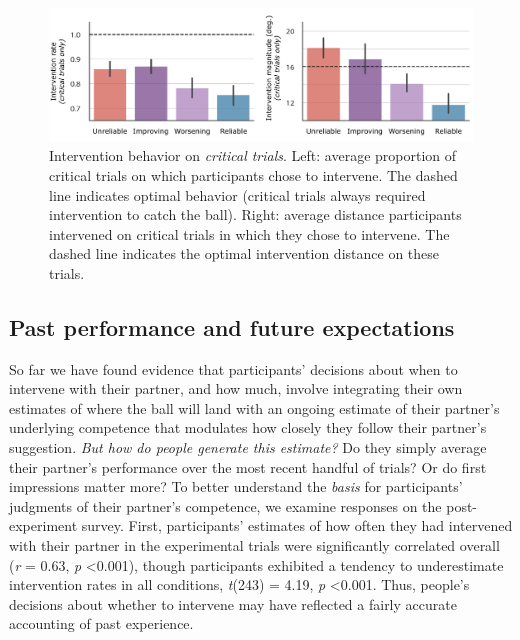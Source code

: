 \documentclass[10pt,letterpaper]{article}
\begin{document}
\begin{figure}[H]
\begin{center}
\includegraphics[width=\linewidth]{img/critical_trial_intervention_summary.pdf}
\end{center}
\caption{Intervention behavior on \textit{critical trials}. Left: average proportion of critical trials on which participants chose to intervene. The dashed line indicates optimal behavior (critical trials always required intervention to catch the ball). Right: average distance participants intervened on critical trials in which they chose to intervene. The dashed line indicates the optimal intervention distance on these trials.} 
\label{fig:critical_trials}
\end{figure}


\subsection{Past performance and future expectations}

So far we have found evidence that participants' decisions about when to intervene with their partner, and how much, involve integrating their own estimates of where the ball will land with an ongoing estimate of their partner's underlying competence that modulates how closely they follow their partner's suggestion. \textit{But how do people generate this estimate?} Do they simply average their partner's performance over the most recent handful of trials? Or do first impressions matter more? To better understand the \textit{basis} for participants' judgments of their partner's competence, we examine responses on the post-experiment survey. First, participants' estimates of how often they had intervened with their partner in the experimental trials were significantly correlated overall (\textit{r} = 0.63, \textit{p} \textless{0.001}), though participants exhibited a tendency to underestimate intervention rates in all conditions, \textit{t}(243) = 4.19, \textit{p} \textless{0.001}. Thus, people's decisions about whether to intervene may have reflected a fairly accurate accounting of past experience. 
\end{document}
